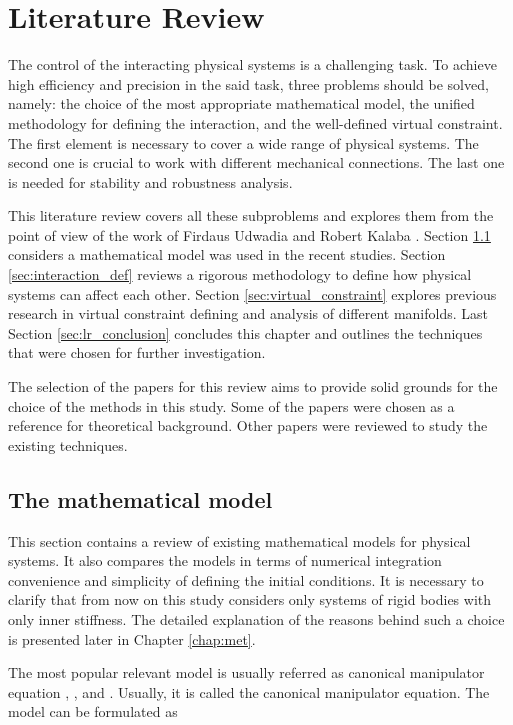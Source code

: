 \chapter{Literature Review}
\label{chap:lr}


The control of the interacting physical systems is a challenging
task. To achieve high efficiency and precision in the said task, three problems 
should be solved, namely: the choice of the most appropriate mathematical model, the
unified methodology for defining the interaction, and the well-defined
virtual constraint. The first element is necessary to cover a wide range
of physical systems. The second one is crucial to work with
different mechanical connections. The last one is needed
for stability and robustness analysis.


This literature review covers all these subproblems and explores them
from the point of view of the work of Firdaus Udwadia and Robert Kalaba
\cite{UdwadiaKalabaApproach}. Section \ref{sec:math_model} considers
a mathematical model was used in the recent studies. Section
\ref{sec:interaction_def} reviews a rigorous methodology to define
how physical systems can affect each other. Section \ref{sec:virtual_constraint}
explores previous research in virtual constraint defining and analysis
of different manifolds. Last Section \ref{sec:lr_conclusion}
concludes this chapter and outlines the techniques that were chosen for 
further investigation.


The selection of the papers for this review aims to provide solid grounds for
the choice of the methods in this study. Some of the papers were chosen as a
reference for theoretical background. Other papers were reviewed to study the
existing techniques.


\section{The mathematical model} \label{sec:math_model}


This section contains a review of existing mathematical models for physical
systems. It also compares the models in terms of numerical
integration convenience and simplicity of defining the initial conditions.
It is necessary to clarify that from now on this study considers only systems
of rigid bodies with only inner stiffness. The detailed explanation of the reasons 
behind such a choice is presented later in Chapter \ref{chap:met}.


The most popular relevant model is usually referred as canonical manipulator 
equation \cite{UdwadiaKalabaApproach}, \cite{AppOfUdwadiaKalabaApproach}, and
\cite{UnifiedFrameworkOfRobotControl}. Usually, it is
called the canonical manipulator equation. The model can be formulated
as



